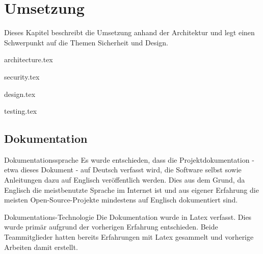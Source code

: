 \begin{comment}
(Implementierung) Architektur und Design beschrieben: Mit begründeten Architekturentscheidungen, mit Diskussion, wie Qualitätsattribute sichergestellt wurden (welche Qualität wurde erreicht?), mit Dokumentation, welche Experimente/Tests durchgeführt wurden und welche Lösungsoptionen aufgrund der Ergebnisse dieser Experimente/Tests
verworfen wurden (was ging schief?)
\end{comment}

\chapter{Umsetzung} \label{sec:implementation}

Dieses Kapitel beschreibt die Umsetzung anhand der Architektur und legt einen Schwerpunkt auf die Themen Sicherheit und Design.

{architecture.tex}

\clearpage
{security.tex}

\clearpage
{design.tex}

\clearpage
{testing.tex}

\section{Dokumentation} \label{sec:implementation:documentation}

\begin{decision}{Dokumentationssprache}
Es wurde entschieden, dass die Projektdokumentation - etwa dieses Dokument - auf Deutsch verfasst wird, die Software selbst sowie Anleitungen dazu auf Englisch veröffentlich werden. Dies aus dem Grund, da Englisch die meistbenutzte Sprache im Internet ist \cite{websitelanguages} und aus eigener Erfahrung die meisten Open-Source-Projekte mindestens auf Englisch dokumentiert sind.
\end{decision}

\begin{decision}{Dokumentations-Technologie}
Die Dokumentation wurde in Latex verfasst. Dies wurde primär aufgrund der vorherigen Erfahrung entschieden. Beide Teammitglieder hatten bereits Erfahrungen mit Latex gesammelt und vorherige Arbeiten damit erstellt.
\end{decision}